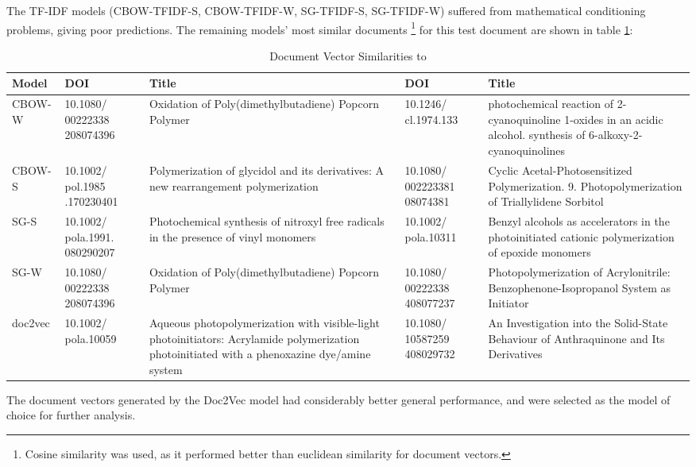  The TF-IDF models (CBOW-TFIDF-S, CBOW-TFIDF-W, SG-TFIDF-S, SG-TFIDF-W) suffered from mathematical conditioning problems, giving poor predictions. The remaining models' most similar documents \footnote{Cosine similarity was used, as it performed better than euclidean similarity for document vectors.} for this test document are shown in table \ref{tab:DOCSIMS}:
\begin{table}[H]
\centering
\caption[Examination of Document Vector similarities]{Document Vector Similarities to \cite {docassay}}
\label{tab:DOCSIMS}
\begin{tabular}{|l|p{2cm}|p{4cm}|p{2cm}|p{4cm}|}
\hline
Model           & DOI            & Title            & DOI              & Title              \\ \hline
CBOW-W               & 10.1080/ 00222338 208074396         & \footnotesize{Oxidation of Poly(dimethylbutadiene) Popcorn Polymer} &  10.1246/ cl.1974.133               &                   \footnotesize{photochemical reaction of 2-cyanoquinoline 1-oxides in an acidic alcohol. synthesis of 6-alkoxy-2-cyanoquinolines} \\ \hline
CBOW-S               & 10.1002/ pol.1985 .170230401          &  \footnotesize{Polymerization of glycidol and its derivatives: A new rearrangement polymerization}
                & 10.1080/ 002223381 08074381                & \footnotesize{Cyclic Acetal-Photosensitized Polymerization. 9. Photopolymerization of Triallylidene Sorbitol}
                   \\ \hline
SG-S                 & 10.1002/ pola.1991. 080290207            &   \footnotesize{Photochemical synthesis of nitroxyl free radicals in the presence of vinyl monomers}
               &  10.1002/ pola.10311              &  \footnotesize{Benzyl alcohols as accelerators in the photoinitiated cationic polymerization of epoxide monomers}
                  \\ \hline
SG-W                 & 10.1080/ 00222338 208074396            &    \footnotesize{Oxidation of Poly(dimethylbutadiene) Popcorn Polymer}
              & 10.1080/ 00222338 408077237                &  \footnotesize{Photopolymerization of Acrylonitrile: Benzophenone-Isopropanol System as Initiator}
                 \\ \hline
doc2vec                    &  10.1002/ pola.10059              &  \footnotesize{Aqueous photopolymerization with visible-light photoinitiators: Acrylamide polymerization photoinitiated with a phenoxazine dye/amine system}
                & 10.1080/ 10587259 408029732                 & \footnotesize{ An Investigation into the Solid-State Behaviour of Anthraquinone and Its Derivatives}
                 \\ \hline
\end{tabular}
\end{table}
The document vectors generated by the Doc2Vec model had considerably better general performance, and were selected as the model of choice for further analysis.  
